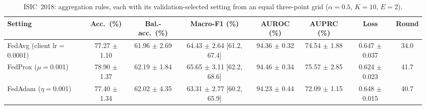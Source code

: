 \begin{table}[!t]
\caption{ISIC~2018: aggregation rules, each with its validation-selected setting from an equal three-point grid ($\alpha{=}0.5$, $K{=}10$, $E{=}2$).}
\label{tab:18-strategy}
\centering
\footnotesize
\begin{tabular}{lccccccc}
\toprule
Setting & Acc.\ (\%) & Bal.-acc.\ (\%) & Macro-F1 (\%) & AUROC (\%) & AUPRC (\%) & Loss & Round \\
\midrule
FedAvg (client lr$=$0.0001) & 77.27 $\pm$ 1.10 & 61.96 $\pm$ 2.69 & 64.43 $\pm$ 2.64 [61.2, 67.4] & 94.36 $\pm$ 0.32 & 74.54 $\pm$ 1.88 & 0.647 $\pm$ 0.037 & 34.0 \\
FedProx ($\mu$$=$0.001) & 78.90 $\pm$ 1.37 & 62.19 $\pm$ 1.84 & 65.65 $\pm$ 3.11 [62.2, 68.6] & 94.46 $\pm$ 0.34 & 75.57 $\pm$ 2.85 & 0.624 $\pm$ 0.023 & 41.7 \\
FedAdam ($\eta$$=$0.001) & 77.40 $\pm$ 1.34 & 62.02 $\pm$ 4.35 & 63.31 $\pm$ 2.77 [60.2, 65.9] & 94.23 $\pm$ 0.44 & 72.09 $\pm$ 1.15 & 0.648 $\pm$ 0.015 & 40.7 \\
\bottomrule
\end{tabular}
\end{table}